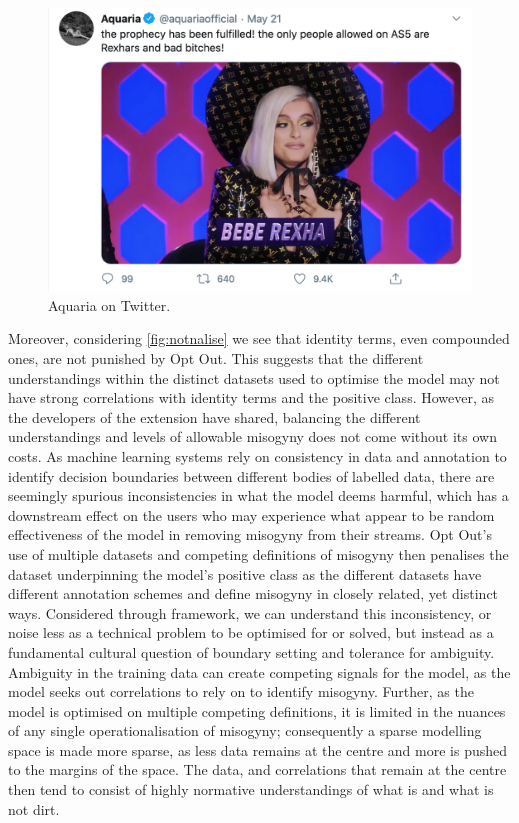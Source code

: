 \begin{figure}[!ht]
  \centering
  \includegraphics[scale=0.5]{aquaria.png}
  \caption{Aquaria on Twitter.}
  \label{fig:aquaria}
\end{figure}

Moreover, considering \autoref{fig:notnalise} we see that identity terms, even compounded ones, are not punished by Opt Out. 
This suggests that the different understandings within the distinct datasets used to optimise the model may not have strong correlations with identity terms and the positive class.
However, as the developers of the extension have shared, balancing the different understandings and levels of allowable misogyny does not come without its own costs.
As machine learning systems rely on consistency in data and annotation to identify decision boundaries between different bodies of labelled data, there are seemingly spurious inconsistencies in what the model deems harmful, which has a downstream effect on the users who may experience what appear to be random effectiveness of the model in removing misogyny from their streams. 
Opt Out's use of multiple datasets and competing definitions of misogyny then penalises the dataset underpinning the model's positive class as the different datasets have different annotation schemes and define misogyny in closely related, yet distinct ways.
Considered through \citet{Douglas:1966} framework, we can understand this inconsistency, or noise less as a technical problem to be optimised for or solved, but instead as a fundamental cultural question of boundary setting and tolerance for ambiguity.
Ambiguity in the training data can create competing signals for the model, as the model seeks out correlations to rely on to identify misogyny. 
Further, as the model is optimised on multiple competing definitions, it is limited in the nuances of any single operationalisation of misogyny; consequently a sparse modelling space is made more sparse, as less data remains at the centre and more is pushed to the margins of the space. The data, and correlations that remain at the centre then tend to consist of highly normative understandings of what is and what is not dirt.

